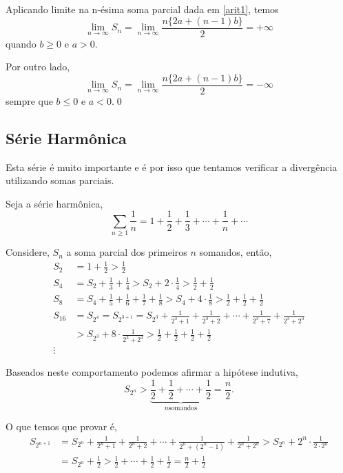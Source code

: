 \begin{prvc}{}{}
  Aplicando limite na n-\'{e}sima soma parcial dada em
\eqref{arit1}, temos
\begin{equation*}
    \lim_{n\to\infty}S_n=\lim_{n\to\infty}\frac{n\{2a+(n-1)b\}}{2}=+\infty
\end{equation*}
quando $b\ge 0$ e $a>0$.

Por outro lado,
\begin{equation*}
    \lim_{n\to\infty}S_n=\lim_{n\to\infty}\frac{n\{2a+(n-1)b\}}{2}=-\infty
\end{equation*}
sempre que $b\le 0$ e $a<0$.\qed
\end{prvc}

\subsection{S\'{e}rie Harm\^{o}nica}
Esta s\'{e}rie \'{e} muito importante e \'{e} por isso que tentamos verificar
a diverg\^{e}ncia utilizando somas parciais.

Seja a s\'{e}rie harm\^{o}nica,
\begin{equation*}
  \sum_{n\geq
  1}\frac{1}{n}=1+\frac{1}{2}+\frac{1}{3}+\cdots+\frac{1}{n}+\cdots
\end{equation*}

Considere, $S_n$ a soma parcial dos primeiros $n$ somandos, ent\~{a}o,
\begin{align*}
  S_2 &=1+\frac{1}{2}>\frac{1}{2} \\[2ex]
  S_4 &=S_2+\frac{1}{3}+\frac{1}{4}>S_2+2\cdot\frac{1}{4}>\frac{1}{2}+\frac{1}{2}\\[2ex]
  S_8 &= S_4+\frac{1}{5}+\frac{1}{6}+\frac{1}{7}+\frac{1}{8}>S_4
  +4\cdot\frac{1}{8}>\frac{1}{2}+\frac{1}{2}+\frac{1}{2} \\[2ex]
  S_{16}&=S_{2^4}=S_{2^{3+1}}=S_{2^3}+\frac{1}{2^3+1}+\frac{1}{2^3+2}+\cdots+\frac{1}{2^3+7}+\frac{1}{2^3+2^3}\\[2ex]
        &>S_{2^3}+8\cdot\frac{1}{2^3+2^3}>\frac{1}{2}+\frac{1}{2}+\frac{1}{2}+\frac{1}{2}\\[2ex]
  \vdots&
\end{align*}

Baseados neste comportamento podemos afirmar a hip\'{o}tese indutiva,
\begin{equation*}
    S_{2^n}>\underbrace{\frac{1}{2}+\frac{1}{2}+\cdots+\frac{1}{2}}_{ n
    \text{somandos}}=\frac{n}{2}.
\end{equation*}

O que temos que provar \'{e},
\begin{align*}
S_{2^{n+1}}&=S_{2^n}+\frac{1}{2^n+1}+\frac{1}{2^n+2}+\cdots+\frac{1}{2^n+(2^n-1)}+\frac{1}{2^n+2^n}>S_{2^n}
+2^n\cdot\frac{1}{2\cdot 2^{n}}\\[2ex]
   &=S_{2^n}+\frac{1}{2}>\frac{1}{2}+\cdots+\frac{1}{2}+\frac{1}{2}=\frac{n}{2}+\frac{1}{2}
\end{align*}

